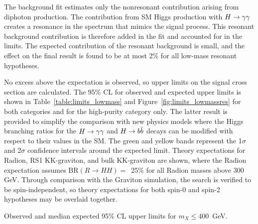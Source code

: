 The background fit estimates only the nonresonant contribution arising from diphoton
production. The contribution from SM Higgs production with $H\to\gamma\gamma$ creates a resonance in the
spectrum that mimics the signal process. This resonant background
contribution is therefore added in the fit and accounted for in the limits.
The expected contribution of the resonant background is small, and the
effect on the final result is found to be at most 2\% for all low-mass resonant hypotheses.

No excess above the expectation is observed, so upper limits on the signal cross section are calculated.
The 95\% CL for observed and expected upper limits is shown in
Table~\ref{table:limits_lowmass} and Figure~\ref{fig:limits_lowmassres}
for both categories and for the high-purity category only.
The latter result is provided to simplify the comparison with new physics models where
the Higgs branching ratios for the $H\to\gamma\gamma$ and $H\to b\bar{b}$ decays can be modified with respect to their
values in the SM.
The green and yellow bands represent the 1$\sigma$ and 2$\sigma$
confidence intervals around the expected limit. Theory expectations for Radion, RS1 KK-graviton, and 
bulk KK-graviton are shown, where the Radion expectation assumes $\text{BR}(R\rightarrow HH) =$~25\%
for all Radion masses above 300 GeV. Through comparison with the Graviton simulation,
the search is verified to be spin-independent, so theory expectations for both spin-0 and spin-2
hypotheses may be overlaid together.

\begin{table}[ht!]
  \centering
  \renewcommand{\arraystretch}{1.4}
  \caption{Observed and median expected 95\% CL upper limits for $m_X \le 400$~GeV.}
  
  \label{table:limits_lowmass}
\end{table}

